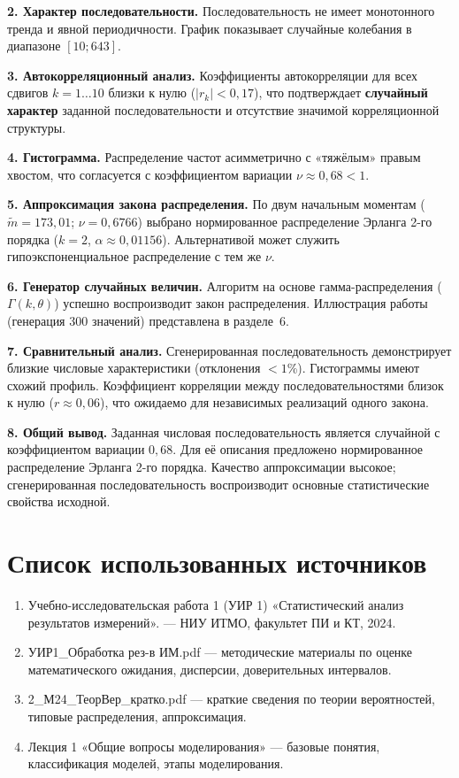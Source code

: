 \documentclass[a4paper,12pt]{article}
\begin{document}
\textbf{2. Характер последовательности.} Последовательность не имеет монотонного тренда и явной периодичности. График показывает случайные колебания в диапазоне $[10; 643]$.

\textbf{3. Автокорреляционный анализ.} Коэффициенты автокорреляции для всех сдвигов $k=1\dots10$ близки к нулю ($|r_k| < 0{,}17$), что подтверждает \textbf{случайный характер} заданной последовательности и отсутствие значимой корреляционной структуры.

\textbf{4. Гистограмма.} Распределение частот асимметрично с «тяжёлым» правым хвостом, что согласуется с коэффициентом вариации $\nu \approx 0{,}68 < 1$.

\textbf{5. Аппроксимация закона распределения.} По двум начальным моментам ($\tilde{m}=173{,}01$; $\nu=0{,}6766$) выбрано нормированное распределение Эрланга 2-го порядка ($k=2$, $\alpha \approx 0{,}01156$). Альтернативой может служить гипоэкспоненциальное распределение с тем же $\nu$.

\textbf{6. Генератор случайных величин.} Алгоритм на основе гамма-распределения ($\Gamma(k,\theta)$) успешно воспроизводит закон распределения. Иллюстрация работы (генерация 300 значений) представлена в разделе~6.

\textbf{7. Сравнительный анализ.} Сгенерированная последовательность демонстрирует близкие числовые характеристики (отклонения $<1$\%). Гистограммы имеют схожий профиль. Коэффициент корреляции между последовательностями близок к нулю ($r \approx 0{,}06$), что ожидаемо для независимых реализаций одного закона.

\textbf{8. Общий вывод.} Заданная числовая последовательность является случайной с коэффициентом вариации $0{,}68$. Для её описания предложено нормированное распределение Эрланга 2-го порядка. Качество аппроксимации высокое; сгенерированная последовательность воспроизводит основные статистические свойства исходной.

\section*{Список использованных источников}

\begin{enumerate}
    \item Учебно-исследовательская работа 1 (УИР 1) «Статистический анализ результатов измерений». — НИУ ИТМО, факультет ПИ и КТ, 2024.
    \item УИР1\_Обработка рез-в ИМ.pdf — методические материалы по оценке математического ожидания, дисперсии, доверительных интервалов.
    \item 2\_М24\_ТеорВер\_кратко.pdf — краткие сведения по теории вероятностей, типовые распределения, аппроксимация.
    \item Лекция 1 «Общие вопросы моделирования» — базовые понятия, классификация моделей, этапы моделирования.
\end{enumerate}
\end{document}
